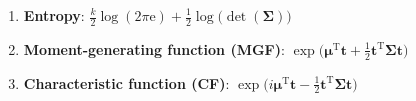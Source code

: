 \begin{enumerate}





    \item
    \textbf{Entropy}: $  {\displaystyle {\frac {k}{2}}\log {\mathord {\left(2\pi \mathrm {e} \right)}}+{\frac {1}{2}}\log (\det {\mathord {\left({\boldsymbol {\Sigma }}\right)}}}) $
    \hfill\cite{wiki/Multivariate_normal_distribution}

    \item
    \textbf{Moment-generating function (MGF)}: $  {\displaystyle \exp \!{\Big (}{\boldsymbol {\mu }}^{\mathrm {T} }\mathbf {t} +{\tfrac {1}{2}}\mathbf {t} ^{\mathrm {T} }{\boldsymbol {\Sigma }}\mathbf {t} {\Big )}} $
    \hfill\cite{wiki/Multivariate_normal_distribution}

    \item
    \textbf{Characteristic function (CF)}: $  {\displaystyle \exp \!{\Big (}i{\boldsymbol {\mu }}^{\mathrm {T} }\mathbf {t} -{\tfrac {1}{2}}\mathbf {t} ^{\mathrm {T} }{\boldsymbol {\Sigma }}\mathbf {t} {\Big )}} $
    \hfill\cite{wiki/Multivariate_normal_distribution}






\end{enumerate}











